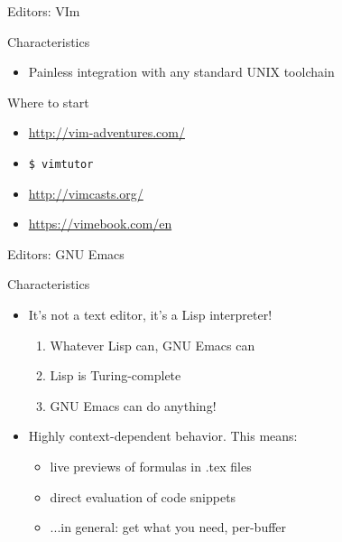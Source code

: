 \documentclass[10pt]{beamer}
\begin{document}
\begin{frame}[t]{Editors: VIm}
{\begin{block}{Characteristics}
\begin{itemize}
      \item Painless integration with any standard UNIX toolchain
      \end{itemize}
    \end{block}
    \begin{block}{Where to start}
      \begin{itemize}
      \item \url{http://vim-adventures.com/}
      \item \texttt{\$ vimtutor}
      \item \url{http://vimcasts.org/}
      \item \url{https://vimebook.com/en}
      \end{itemize}
    \end{block}
  }
\end{frame}

\begin{frame}[t]{Editors: GNU Emacs} %
  \begin{block}{Characteristics}
    \begin{itemize}[<+->]
    \item It's not a text editor, it's a Lisp interpreter!
      \begin{enumerate}[<+->]
      \item Whatever Lisp can, GNU Emacs can
      \item Lisp is Turing-complete
      \item GNU Emacs can do \alert{anything}!
      \end{enumerate}
    \item Highly context-dependent behavior. This means:
      \begin{itemize}[<+->]
      \item live previews of formulas in .tex files
      \item direct evaluation of code snippets
      \item ...in general: get what you need, per-buffer
      \end{itemize}
    \end{itemize}
  \end{block}
\end{frame}
\end{document}
